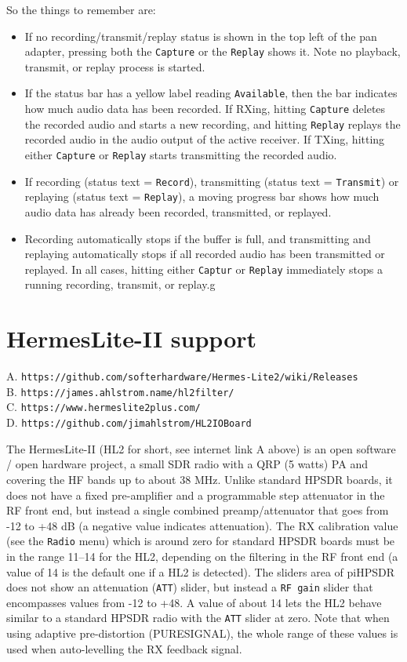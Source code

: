 \documentclass[12pt]{book}
\def\rett#1{\texttt{\color{red}#1}}
\def\bltt#1{\texttt{\color{blue}#1}}
\def\pH{pi\-HPSDR\xspace}
\begin{document}
So the things to remember are:
\begin{itemize}
\item{If no recording/transmit/replay status is shown in the top left of the pan adapter, pressing
both the \bltt{Capture}
or the \bltt{Replay} shows it. Note no playback, transmit, or replay process is started.}
\item{If the status bar has a yellow label reading \rett{Available}, then the bar indicates how much
audio data has been recorded. If RXing, hitting
\bltt{Capture} deletes the recorded audio and starts a new recording, and hitting \bltt{Replay}
replays the recorded audio in the audio output of the active receiver.
If TXing, hitting either \bltt{Capture} or \bltt{Replay} starts transmitting the recorded audio.}
\item{If recording (status text = \rett{Record}), transmitting (status text = \rett{Transmit})
or replaying (status text = \rett{Replay}), a moving progress
bar shows how much audio data has already been recorded, transmitted, or replayed.}
\item{Recording automatically stops if the buffer is full, and transmitting and replaying
 automatically stops if all recorded audio
has been transmitted or replayed. In all cases, hitting either \bltt{Captur} or \bltt{Replay}
immediately stops a running recording, transmit, or replay.}g
\end{itemize}
\section{HermesLite-II support}
\label{sec:hl2support}

A. \texttt{https://github.com/softerhardware/Hermes-Lite2/wiki/Releases} \\
B. \texttt{https://james.ahlstrom.name/hl2filter/}  \\
C. \texttt{https://www.hermeslite2plus.com/}\\
D. \texttt{https://github.com/jimahlstrom/HL2IOBoard}



The HermesLite-II (HL2 for  short, see internet link A above) is an open software / open hardware project,
a small SDR radio with a QRP (5 watts) PA
and covering the HF bands up to about 38 MHz. Unlike standard HPSDR boards, it does not have a fixed
pre-amplifier and a programmable step attenuator in the RF front end, but instead a single combined
preamp/attenuator that goes from -12 to +48 dB (a negative value indicates attenuation). The RX
calibration value (see the \bltt{Radio} menu) which is around zero for standard HPSDR boards must
be in the range 11--14 for the HL2, depending on the filtering in the RF front end
(a value of 14 is the default one if a HL2 is detected). The sliders
area of \pH does not show an attenuation (\texttt{ATT}) slider, but instead a \texttt{RF gain}
slider that encompasses values from -12 to +48. A value of about 14 lets the HL2 behave similar
to a standard HPSDR radio with the \texttt{ATT} slider at zero. Note that when using adaptive
pre-distortion (PURESIGNAL), the whole range of these values is used when auto-levelling the
RX feedback signal.
\end{document}

